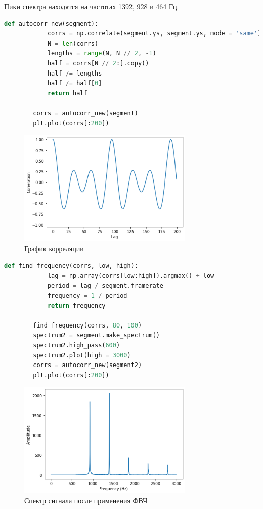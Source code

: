 \documentclass[a4paper, 12pt]{report}
\begin{document}
	Пики спектра находятся на частотах 1392, 928 и 464 Гц.
	\begin{lstlisting}[language=Python,caption=Новая функция для автокорреляции]
		def autocorr_new(segment):
			corrs = np.correlate(segment.ys, segment.ys, mode = 'same')
			N = len(corrs)
			lengths = range(N, N // 2, -1)
			half = corrs[N // 2:].copy()
			half /= lengths
			half /= half[0]
			return half
		
		corrs = autocorr_new(segment)
		plt.plot(corrs[:200])
	\end{lstlisting}
	\begin{figure}[H]
		\centering
		\includegraphics[width=0.75\textwidth]{sax3.png}
		\caption{График корреляции}
		\label{fig:sax3}
	\end{figure}
	\begin{lstlisting}[language=Python,caption=Применили ФВЧ]
		def find_frequency(corrs, low, high):
			lag = np.array(corrs[low:high]).argmax() + low
			period = lag / segment.framerate
			frequency = 1 / period
			return frequency
		
		find_frequency(corrs, 80, 100)
		spectrum2 = segment.make_spectrum()
		spectrum2.high_pass(600)
		spectrum2.plot(high = 3000)
		corrs = autocorr_new(segment2)
		plt.plot(corrs[:200])
	\end{lstlisting}
	\begin{figure}[H]
		\centering
		\includegraphics[width=0.75\textwidth]{sax4.png}
		\caption{Спектр сигнала после применения ФВЧ}
		\label{fig:sax4}
	\end{figure}
\end{document}
